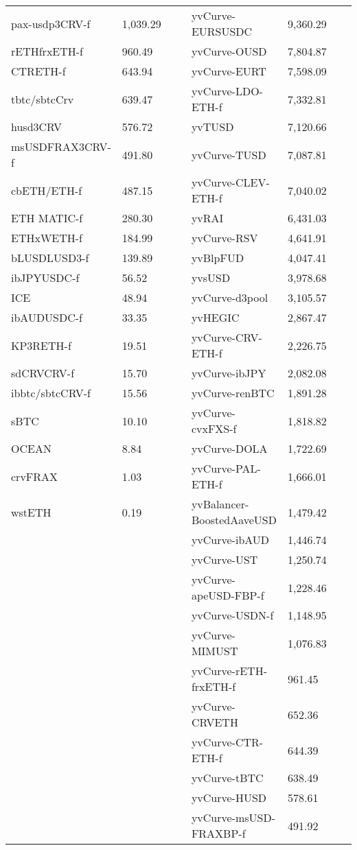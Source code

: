 \begin{longtable}{@{}p{0.25\linewidth}p{0.25\linewidth}p{0.25\linewidth}p{0.25\linewidth}@{}}
pax-usdp3CRV-f & 1,039.29 & yvCurve-EURSUSDC & 9,360.29 \\
rETHfrxETH-f & 960.49 & yvCurve-OUSD & 7,804.87 \\
CTRETH-f & 643.94 & yvCurve-EURT & 7,598.09 \\
tbtc/sbtcCrv & 639.47 & yvCurve-LDO-ETH-f & 7,332.81 \\
husd3CRV & 576.72 & yvTUSD & 7,120.66 \\
msUSDFRAX3CRV-f & 491.80 & yvCurve-TUSD & 7,087.81 \\
cbETH/ETH-f & 487.15 & yvCurve-CLEV-ETH-f & 7,040.02 \\
ETH MATIC-f & 280.30 & yvRAI & 6,431.03 \\
ETHxWETH-f & 184.99 & yvCurve-RSV & 4,641.91 \\
bLUSDLUSD3-f & 139.89 & yvBlpFUD & 4,047.41 \\
ibJPYUSDC-f & 56.52 & yvsUSD & 3,978.68 \\
ICE & 48.94 & yvCurve-d3pool & 3,105.57 \\
ibAUDUSDC-f & 33.35 & yvHEGIC & 2,867.47 \\
KP3RETH-f & 19.51 & yvCurve-CRV-ETH-f & 2,226.75 \\
sdCRVCRV-f & 15.70 & yvCurve-ibJPY & 2,082.08 \\
ibbtc/sbtcCRV-f & 15.56 & yvCurve-renBTC & 1,891.28 \\
sBTC & 10.10 & yvCurve-cvxFXS-f & 1,818.82 \\
OCEAN & 8.84 & yvCurve-DOLA & 1,722.69 \\
crvFRAX & 1.03 & yvCurve-PAL-ETH-f & 1,666.01 \\
wstETH & 0.19 & yvBalancer-BoostedAaveUSD & 1,479.42 \\
 &  & yvCurve-ibAUD & 1,446.74 \\
 &  & yvCurve-UST & 1,250.74 \\
 &  & yvCurve-apeUSD-FBP-f & 1,228.46 \\
 &  & yvCurve-USDN-f & 1,148.95 \\
 &  & yvCurve-MIMUST & 1,076.83 \\
 &  & yvCurve-rETH-frxETH-f & 961.45 \\
 &  & yvCurve-CRVETH & 652.36 \\
 &  & yvCurve-CTR-ETH-f & 644.39 \\
 &  & yvCurve-tBTC & 638.49 \\
 &  & yvCurve-HUSD & 578.61 \\
 &  & yvCurve-msUSD-FRAXBP-f & 491.92 \\

\end{longtable}
